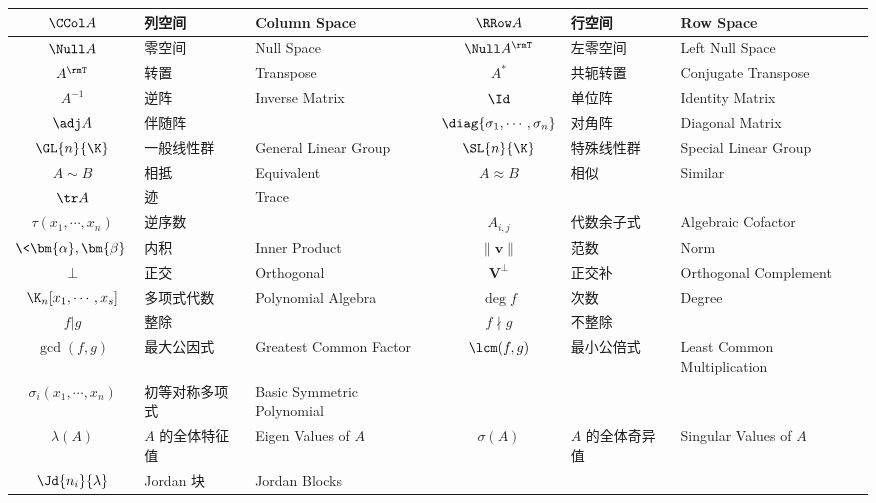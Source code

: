 \documentclass[UTF8]{ctexart}
\begin{document}
\begin{center}
\begin{tabular}{|c|l|l||c|l|l|}
                    $\CCol A$ & 列空间 & Column Space & $\RRow A$ & 行空间 & Row Space\\
                    \hline
                    $\Null A$ & 零空间 & Null Space & $\Null A^{\rmT}$ & 左零空间 & Left Null Space\\
                    \hline
                    $A^{\rmT}$ & 转置 & Transpose & $A^*$ & 共轭转置 & Conjugate Transpose\\
                    \hline
                    $A^{-1}$ & 逆阵 & Inverse Matrix & $\Id$ & 单位阵 & Identity Matrix\\
                    \hline
                    $\adj A$ & 伴随阵 & & $\diag\{\sigma_1,\cdots,\sigma_n\}$ & 对角阵 & Diagonal Matrix\\
                    \hline
                    $\GL{n}{\K}$ & 一般线性群 & General Linear Group & $\SL{n}{\K}$ & 特殊线性群 & Special Linear Group\\
                    \hline
                    $A\sim B$ & 相抵 & Equivalent & $A\approx B$ & 相似 & Similar\\
                    \hline
                    $\tr A$ & 迹 & Trace &\\
                    \hline
                    $\tau(x_1,\cdots,x_n)$ & 逆序数 & & $A_{i,j}$ & 代数余子式 & Algebraic Cofactor\\
                    \hline
                    $\<\bm{\alpha},\bm{\beta}\>$ & 内积 & Inner Product & $\|\bm{v}\|$ & 范数 & Norm\\
                    \hline
                    $\perp$ & 正交 & Orthogonal & $\mathbf{V}^\perp$ & 正交补 & Orthogonal Complement\\
                    \hline
                    $\K_n[x_1,\cdots,x_s]$ & 多项式代数 & Polynomial Algebra & $\deg f$ & 次数 & Degree\\
                    \hline
                    $f|g$ & 整除 & & $f\nmid g$ & 不整除 &\\
                    \hline
                    $\gcd(f,g)$ & 最大公因式 & Greatest Common Factor & $\lcm(f,g)$ & 最小公倍式 & Least Common Multiplication\\
                    \hline
                    $\sigma_i(x_1,\cdots,x_n)$ & 初等对称多项式 & Basic Symmetric Polynomial\\
                    \hline
                    $\lambda(A)$ & $A$ 的全体特征值 & Eigen Values of $A$ & $\sigma(A)$ & $A$ 的全体奇异值 & Singular Values of $A$\\
                    \hline
                    $\Jd{n_i}{\lambda}$ & Jordan 块 & Jordan Blocks & & & \\
                    \hline
                \end{tabular}
            \end{center}
\end{document}
